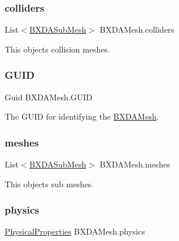 \subsubsection{\texorpdfstring{colliders}{colliders}}
{\footnotesize\ttfamily List$<$\hyperlink{class_b_x_d_a_mesh_1_1_b_x_d_a_sub_mesh}{B\+X\+D\+A\+Sub\+Mesh}$>$ B\+X\+D\+A\+Mesh.\+colliders\hspace{0.3cm}{\ttfamily [get]}}



This object\textquotesingle{}s collision meshes. 

\mbox{\label{class_b_x_d_a_mesh_a7544e5c82afe8c5522424505766be4c0}} 
\subsubsection{\texorpdfstring{G\+U\+ID}{GUID}}
{\footnotesize\ttfamily Guid B\+X\+D\+A\+Mesh.\+G\+U\+ID\hspace{0.3cm}{\ttfamily [get]}}



The G\+U\+ID for identifying the \hyperlink{class_b_x_d_a_mesh}{B\+X\+D\+A\+Mesh}. 

\mbox{\label{class_b_x_d_a_mesh_a2782cf37716d225b7dce7dc69bfe03e5}} 
\subsubsection{\texorpdfstring{meshes}{meshes}}
{\footnotesize\ttfamily List$<$\hyperlink{class_b_x_d_a_mesh_1_1_b_x_d_a_sub_mesh}{B\+X\+D\+A\+Sub\+Mesh}$>$ B\+X\+D\+A\+Mesh.\+meshes\hspace{0.3cm}{\ttfamily [get]}}



This object\textquotesingle{}s sub meshes. 

\mbox{\label{class_b_x_d_a_mesh_a37230df9968f8aadca60bb342b08ba1b}} 
\subsubsection{\texorpdfstring{physics}{physics}}
{\footnotesize\ttfamily \hyperlink{class_physical_properties}{Physical\+Properties} B\+X\+D\+A\+Mesh.\+physics\hspace{0.3cm}{\ttfamily [get]}}



